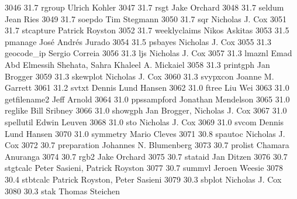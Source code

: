   3046     31.7    rgroup        Ulrich Kohler                           
  3047     31.7    rsgt          Jake Orchard                            
  3048     31.7    seldum        Jean Ries                               
  3049     31.7    soepdo        Tim Stegmann                            
  3050     31.7    sqr           Nicholas J. Cox                         
  3051     31.7    stcapture     Patrick Royston                         
  3052     31.7    weeklyclaims  Nikos Askitas                           
  3053     31.5    pmanage       José Andrés Jurado                    
  3054     31.5    psbayes       Nicholas J. Cox                         
  3055     31.3    geocode_ip    Sergio Correia                          
  3056     31.3    ljs           Nicholas J. Cox                         
  3057     31.3    lmaznl        Emad Abd Elmessih Shehata, Sahra        
                                   Khaleel A. Mickaiel                     
  3058     31.3    printgph      Jan Brogger                             
  3059     31.3    skewplot      Nicholas J. Cox                         
  3060     31.3    svypxcon      Joanne M. Garrett                       
  3061     31.2    svtxt         Dennis Lund Hansen                      
  3062     31.0    ftree         Liu Wei                                 
  3063     31.0    getfilename2  Jeff Arnold                             
  3064     31.0    ppssampford   Jonathan Mendelson                      
  3065     31.0    reglike       Bill Sribney                            
  3066     31.0    showgph       Jan Brogger, Nicholas J. Cox            
  3067     31.0    spellutil     Edwin Leuven                            
  3068     31.0    sto           Nicholas J. Cox                         
  3069     31.0    svcom         Dennis Lund Hansen                      
  3070     31.0    symmetry      Mario Cleves                            
  3071     30.8    spautoc       Nicholas J. Cox                         
  3072     30.7    preparation   Johannes N. Blumenberg                  
  3073     30.7    prolist       Chamara Anuranga                        
  3074     30.7    rgb2          Jake Orchard                            
  3075     30.7    stataid       Jan Ditzen                              
  3076     30.7    stgtcalc      Peter Sasieni, Patrick Royston          
  3077     30.7    summvl        Jeroen Weesie                           
  3078     30.4    stbtcalc      Patrick Royston, Peter Sasieni          
  3079     30.3    sbplot        Nicholas J. Cox                         
  3080     30.3    stak          Thomas Steichen                         
